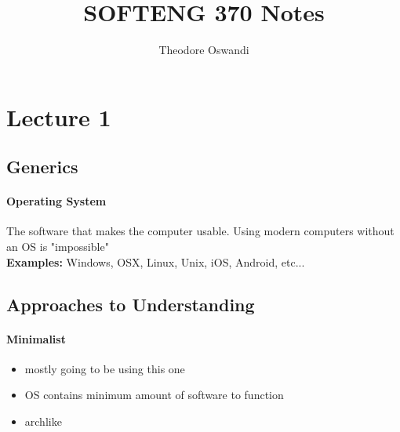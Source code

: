 \documentclass{article}
\title{SOFTENG 370 Notes}
\author{Theodore Oswandi}
\newcommand\tab[1][0.5cm]{\hspace*{#1}}
\begin{document}
 
\maketitle{} 

\tableofcontents
\newpage

\section{Lecture 1}
	\subsection{Generics}
		\paragraph{\tab Operating System} The software that makes the computer usable. Using modern computers without an OS is "impossible"
			\\ \tab \textbf{Examples: }Windows, OSX, Linux, Unix, iOS, Android, etc...


	\subsection{Approaches to Understanding}
		\paragraph{\tab Minimalist}
		\begin{itemize}
			\item mostly going to be using this one
			\item OS contains minimum amount of software to function
			\item archlike
		\end{itemize}
\end{document}

